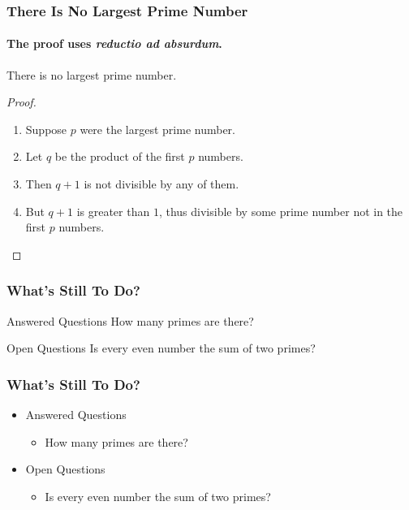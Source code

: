 \documentclass[11pt]{beamer}
\begin{document}
\begin{frame}
\frametitle{There Is No Largest Prime Number}
\framesubtitle{The proof uses \textit{reductio ad absurdum}.}
\begin{theorem}
	There is no largest prime number.
\end{theorem}
\begin{proof}
	\begin{enumerate}
		\item<1-> Suppose $p$ were the largest prime number.
		\item<2-> Let $q$ be the product of the first $p$ numbers.
		\item<3-> Then $q + 1$ is not divisible by any of them.
		\item<1-> But $q + 1$ is greater than $1$, thus divisible by some prime
		number not in the first $p$ numbers.\qedhere
	\end{enumerate}
\end{proof}
\end{frame}

\newtheorem{answeredquestions}[theorem]{Answered Questions}
\newtheorem{openquestions}[theorem]{Open Questions}

\begin{frame}
\frametitle{What’s Still To Do?}
\begin{block}{Answered Questions}
	How many primes are there?
\end{block}
\begin{block}{Open Questions}
	Is every even number the sum of two primes?
\end{block}
\end{frame}


\begin{frame}
\frametitle{What’s Still To Do?}
\begin{itemize}
	\item Answered Questions
	\begin{itemize}
		\item How many primes are there?
	\end{itemize}
	\item Open Questions
	\begin{itemize}
		\item Is every even number the sum of two primes?
	\end{itemize}
\end{itemize}
\end{frame}
\end{document}
